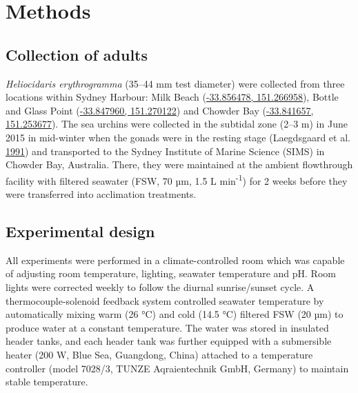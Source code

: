 \documentclass[a4paper,10pt, oneside]{memoir}
\begin{document}
\hypertarget{methods}{%
\section{Methods}\label{methods}}

\hypertarget{collection-of-adults}{%
\subsection{Collection of adults}\label{collection-of-adults}}

\emph{Heliocidaris erythrogramma} (35--44 mm test diameter) were collected from three locations within Sydney Harbour: Milk Beach (\href{https://www.google.com/maps/?q=-33.856478,151.266958}{-33.856478, 151.266958}), Bottle and Glass Point (\href{https://www.google.com/maps/?q=-33.847960,151.270122}{-33.847960, 151.270122}) and Chowder Bay (\href{https://www.google.com/maps/?q=-33.847960,151.270122}{-33.841657, 151.253677}).
The sea urchins were collected in the subtidal zone (2--3 m) in June 2015 in mid-winter when the gonads were in the resting stage (Laegdsgaard et al. \protect\hyperlink{ref-Laegdsgaard1991}{1991}) and transported to the Sydney Institute of Marine Science (SIMS) in Chowder Bay, Australia.
There, they were maintained at the ambient flowthrough facility with filtered seawater (FSW, 70 µm, 1.5 L min\textsuperscript{-1}) for 2 weeks before they were transferred into acclimation treatments.

\hypertarget{experimental-design}{%
\subsection{Experimental design}\label{experimental-design}}

All experiments were performed in a climate-controlled room which was capable of adjusting room temperature, lighting, seawater temperature and pH.
Room lights were corrected weekly to follow the diurnal sunrise/sunset cycle.
A thermocouple-solenoid feedback system controlled seawater temperature by automatically mixing warm (26 °C) and cold (14.5 °C) filtered FSW (20 µm) to produce water at a constant temperature.
The water was stored in insulated header tanks, and each header tank was further equipped with a submersible heater (200 W, Blue Sea, Guangdong, China) attached to a temperature controller (model 7028/3, TUNZE Aqraientechnik GmbH, Germany) to maintain stable temperature.
\end{document}

